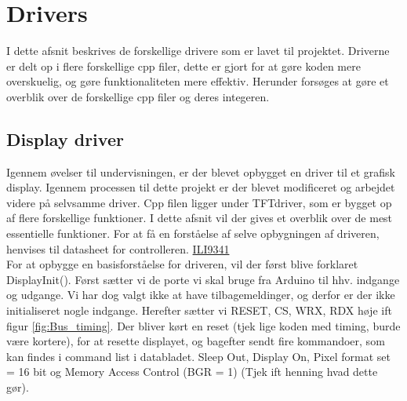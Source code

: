 \graphicspath{{Chapters/Drivers/}}


\section{Drivers}
I dette afsnit beskrives de forskellige drivere som er lavet til projektet. 
Driverne er delt op i flere forskellige cpp filer, dette er gjort for at gøre koden mere overskuelig, og gøre funktionaliteten mere effektiv. Herunder forsøges at gøre et overblik over de forskellige cpp filer og deres integeren.  


\subsection{Display driver}
Igennem øvelser til undervisningen, er der blevet opbygget en driver til et grafisk display. Igennem processen til dette projekt er der blevet modificeret og arbejdet videre på selvsamme driver. Cpp filen ligger under TFTdriver, som er bygget op af flere forskellige funktioner. I dette afsnit vil der gives et overblik over de mest essentielle funktioner. For at få en forståelse af selve opbygningen af driveren, henvises til datasheet for controlleren. 
\href{https://blackboard.au.dk/bbcswebdav/pid-1697983-dt-content-rid-3847230_1/courses/BB-Cou-UUVA-73302/BB-Cou-UUVA-65758_ImportedContent_20170106021228/BB-Cou-STADS-UUVA-52360_ImportedContent_20160107025559/LAB/Lab3a%20Graphic%20LCD%20Display/Files%20for%20LAB3a/ILI9341_v1.11.pdf}{ILI9341} \\
For at opbygge en basisforståelse for driveren, vil der først blive forklaret DisplayInit(). Først sætter vi de porte vi skal bruge fra Arduino til hhv. indgange og udgange. Vi har dog valgt ikke at have tilbagemeldinger, og derfor er der ikke initialiseret nogle indgange. Herefter sætter vi RESET, CS, WRX, RDX høje ift figur \ref{fig:Bus_timing}. Der bliver kørt en reset (tjek lige koden med timing, burde være kortere), for at resette displayet, og bagefter sendt fire kommandoer, som kan findes i command list i databladet. Sleep Out, Display On, Pixel format set = 16 bit og Memory Access Control (BGR = 1) (Tjek ift henning hvad dette gør). 



